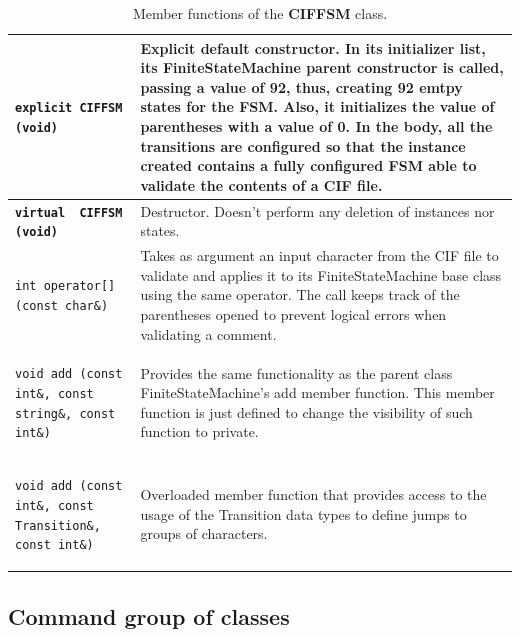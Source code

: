 \documentclass[11pt,twoside,openany,x11names,svgnames]{memoir}
\begin{document}
\begin{table}[h]\footnotesize
\centering
\begin{tabular}{| >{\bfseries}p{9cm} | p{7cm} |}
	\hline
	
	\texttt{explicit CIFFSM (void)} & Explicit default constructor. In its initializer list, its FiniteStateMachine parent constructor is called, passing a value of 92, thus, creating 92 emtpy states for the FSM. Also, it initializes the value of \textbf{parentheses} with a value of 0. In the body, all the transitions are configured so that the instance created contains a fully configured FSM able to validate the contents of a CIF file. \\
	
	\hline
	
	\texttt{virtual ~CIFFSM (void)} & Destructor. Doesn't perform any deletion of instances nor states. \\
	
	\hline
	
	\texttt{int operator[] (const char\&)} & Takes as argument an input character from the CIF file to validate and applies it to its FiniteStateMachine base class using the same operator. The call keeps track of the parentheses opened to prevent logical errors when validating a comment. \\
	
	\hline
	
	\texttt{void add (const int\&, const string\&, const int\&)} & Provides the same functionality as the parent class FiniteStateMachine's add member function. This member function is just defined to change the visibility of such function to private. \\
	
	\hline
	
	\texttt{void add (const int\&, const Transition\&, const int\&)} & Overloaded member function that provides access to the usage of the Transition data types to define jumps to groups of characters. \\
	
	\hline
\end{tabular}
\caption{Member functions of the \textbf{CIFFSM} class.}
\label{tab:CIFFSM-MemberFunctions}
\end{table}

\clearpage 

\subsection{Command group of classes}\label{Command-group-of-classes}
\end{document}
